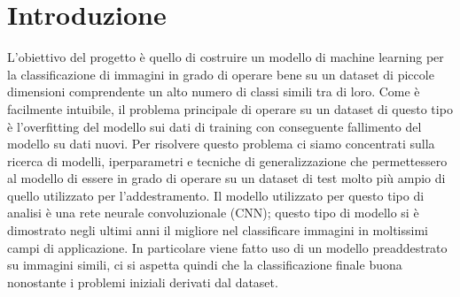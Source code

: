 \section{Introduzione}
L'obiettivo del progetto è quello di costruire un modello di machine learning per la classificazione di immagini in grado di operare bene su un dataset di piccole dimensioni comprendente un alto numero di classi simili tra di loro.
Come è facilmente intuibile, il problema principale di operare su un dataset di questo tipo è l'overfitting del modello sui dati di training con conseguente fallimento del modello su dati nuovi. Per risolvere questo problema ci siamo concentrati sulla ricerca di modelli, iperparametri e tecniche di generalizzazione che permettessero al modello di essere in grado di operare su un dataset di test molto più ampio di quello utilizzato per l'addestramento.
Il modello utilizzato per questo tipo di analisi è una rete neurale convoluzionale (CNN); questo tipo di modello si è dimostrato negli ultimi anni il migliore nel classificare immagini in moltissimi campi di applicazione.
In particolare viene fatto uso di un modello preaddestrato su immagini simili, ci si aspetta quindi che la classificazione finale buona nonostante i problemi iniziali derivati dal dataset.

